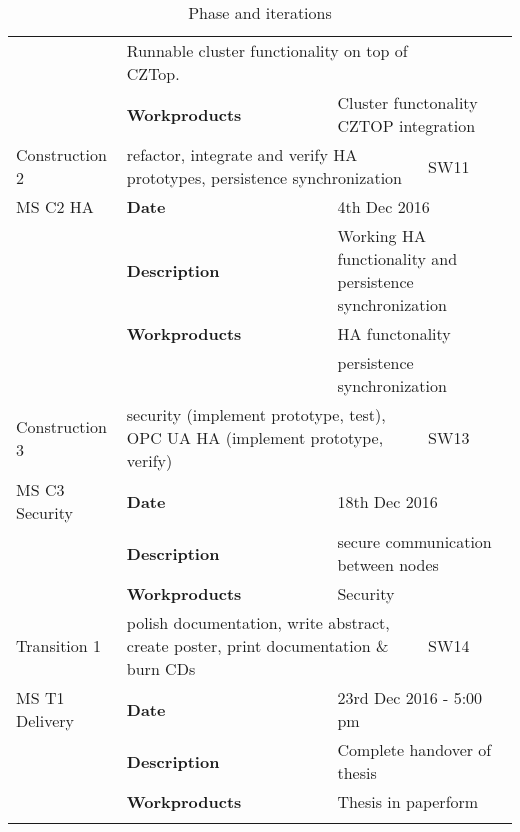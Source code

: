 \begin{center}
\begin{longtable}{|p{25mm}|p{25mm} p{45mm}|p{10mm}|}
		& \multicolumn{2}{l|}{Runnable cluster functionality on top of CZTop.} \\
		& \textbf{Workproducts}
		& \multicolumn{2}{l|}{Cluster functonality CZTOP integration} \\ \hline
	Construction 2
		& \multicolumn{2}{p{70mm}|}{refactor, integrate and verify HA prototypes, persistence synchronization}
		& SW11 \\ \hline
	MS C2 HA
		& \textbf{Date}
		& \multicolumn{2}{l|}{4th Dec 2016} \\
		& \textbf{Description}
		& \multicolumn{2}{l|}{Working HA functionality and persistence synchronization} \\
		& \textbf{Workproducts}
		& \multicolumn{2}{l|}{HA functonality} \\
		& & \multicolumn{2}{l|}{persistence synchronization} \\ \hline
	Construction 3
		& \multicolumn{2}{p{70mm}|}{security (implement prototype, test), OPC UA HA (implement prototype, verify)}
		& SW13 \\ \hline
	MS C3 Security
		& \textbf{Date}
		& \multicolumn{2}{l|}{18th Dec 2016} \\
		& \textbf{Description}
		& \multicolumn{2}{l|}{secure communication between nodes} \\
		& \textbf{Workproducts}
		& \multicolumn{2}{l|}{Security} \\ \hline
	Transition 1
		& \multicolumn{2}{p{70mm}|}{polish documentation, write abstract, create poster, print documentation \& burn CDs}
		& SW14 \\ \hline
	MS T1 Delivery
		& \textbf{Date}
		& \multicolumn{2}{l|}{23rd Dec 2016 - 5:00 pm} \\
		& \textbf{Description}
		& \multicolumn{2}{l|}{Complete handover of thesis} \\
		& \textbf{Workproducts}
		& \multicolumn{2}{l|}{Thesis in paperform} \\ \hline

   \caption{Phase and iterations} \label{tab:phases}
   \end{longtable}
\end{center}
